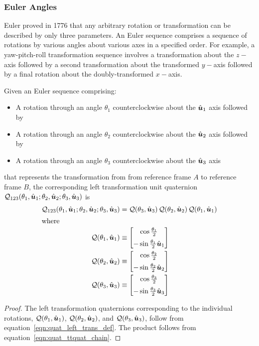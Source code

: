 \subsubsection{Euler Angles}\label{sec:app_to_euler}

Euler proved in 1776 that any arbitrary rotation or transformation can be
described by only three parameters. An Euler sequence comprises a sequence of
rotations by various angles about various axes in a specified order.
For example, a yaw-pitch-roll transformation sequence involves a transformation
about the $z-$axis followed by a second transformation about the transformed
$y-$axis followed by a final rotation about the doubly-transformed $x-$axis.

\begin{theorem}\label{thm:quat_rot_to_quat_general}
Given an Euler sequence comprising:
\begin{itemize}
\item A rotation through an angle $\theta_1$ counterclockwise
about the $\hat{\boldsymbol{u}}_1$ axis followed by
\item A rotation through an angle $\theta_2$ counterclockwise
about the $\hat{\boldsymbol{u}}_2$ axis followed by
\item A rotation through an angle $\theta_3$ counterclockwise
about the $\hat{\boldsymbol{u}}_3$ axis
\end{itemize}
that represents the transformation from
from reference frame $A$ to reference frame $B$,
the corresponding left transformation unit quaternion
$\mathcal{Q}_{123}
  (\theta_{1}, \hat{\boldsymbol{u}}_1; \theta_{2}, \hat{\boldsymbol{u}}_2; \theta_{3}, \hat{\boldsymbol{u}}_3)$ is
\begin{align}
  \quat{Q}_{123}
    (\theta_{1}, \vhat u_1; \theta_{2}, \vhat u_2; \theta_{3}, \vhat u_3) &=
    \QxQxQ{\quat{Q}(\theta_3, \vhat u_3)}
          {\quat{Q}(\theta_2, \vhat u_2)}
          {\quat{Q}(\theta_1, \vhat u_1)}
    \label{eqn:quat_euler_to_quat_general} \\
  \intertext{where}
  \quat{Q}(\theta_1, \vhat u_1) &\equiv \quattrot{\theta_1}{\vhat u_1} \\
  \quat{Q}(\theta_2, \vhat u_2) &\equiv \quattrot{\theta_2}{\vhat u_2} \\
  \quat{Q}(\theta_3, \vhat u_3) &\equiv \quattrot{\theta_3}{\vhat u_3}
\end{align}
\end{theorem}
\begin{proof}
The left transformation quaternions corresponding to the individual rotations,
$\mathcal{Q}(\theta_1, \hat{\boldsymbol{u}}_1)$,
$\mathcal{Q}(\theta_2, \hat{\boldsymbol{u}}_2)$, and
$\mathcal{Q}(\theta_3, \hat{\boldsymbol{u}}_3)$,
follow from equation~\eqref{eqn:quat_left_trans_def}.
The product follows from equation~\eqref{eqn:quat_ttquat_chain}.
\end{proof}

